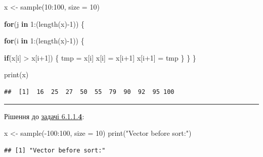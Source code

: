 \documentclass[
]{book}
\newenvironment{Shaded}{\begin{snugshade}}{\end{snugshade}}
\newcommand{\AttributeTok}[1]{\textcolor[rgb]{0.77,0.63,0.00}{#1}}
\newcommand{\ControlFlowTok}[1]{\textcolor[rgb]{0.13,0.29,0.53}{\textbf{#1}}}
\newcommand{\DecValTok}[1]{\textcolor[rgb]{0.00,0.00,0.81}{#1}}
\newcommand{\FunctionTok}[1]{\textcolor[rgb]{0.00,0.00,0.00}{#1}}
\newcommand{\NormalTok}[1]{#1}
\newcommand{\OtherTok}[1]{\textcolor[rgb]{0.56,0.35,0.01}{#1}}
\newcommand{\SpecialCharTok}[1]{\textcolor[rgb]{0.00,0.00,0.00}{#1}}
\newcommand{\StringTok}[1]{\textcolor[rgb]{0.31,0.60,0.02}{#1}}
\begin{document}
\begin{Shaded}
\begin{Highlighting}[]
\NormalTok{x }\OtherTok{\textless{}{-}} \FunctionTok{sample}\NormalTok{(}\DecValTok{10}\SpecialCharTok{:}\DecValTok{100}\NormalTok{, }\AttributeTok{size =} \DecValTok{10}\NormalTok{)}
  
\ControlFlowTok{for}\NormalTok{(j }\ControlFlowTok{in} \DecValTok{1}\SpecialCharTok{:}\NormalTok{(}\FunctionTok{length}\NormalTok{(x)}\SpecialCharTok{{-}}\DecValTok{1}\NormalTok{)) \{}
  
  \ControlFlowTok{for}\NormalTok{(i }\ControlFlowTok{in} \DecValTok{1}\SpecialCharTok{:}\NormalTok{(}\FunctionTok{length}\NormalTok{(x)}\SpecialCharTok{{-}}\DecValTok{1}\NormalTok{)) \{}
    
    \ControlFlowTok{if}\NormalTok{(x[i] }\SpecialCharTok{\textgreater{}}\NormalTok{ x[i}\SpecialCharTok{+}\DecValTok{1}\NormalTok{]) \{}
\NormalTok{      tmp }\OtherTok{=}\NormalTok{ x[i]}
\NormalTok{      x[i] }\OtherTok{=}\NormalTok{ x[i}\SpecialCharTok{+}\DecValTok{1}\NormalTok{]}
\NormalTok{      x[i}\SpecialCharTok{+}\DecValTok{1}\NormalTok{] }\OtherTok{=}\NormalTok{ tmp}
\NormalTok{    \}}
\NormalTok{  \}}
\NormalTok{\}}

\FunctionTok{print}\NormalTok{(x)}
\end{Highlighting}
\end{Shaded}

\begin{verbatim}
##  [1]  16  25  27  50  55  79  90  92  95 100
\end{verbatim}

\begin{center}\rule{0.5\linewidth}{0.5pt}\end{center}

Рішення до \protect\hyperlink{task6114}{задачі 6.1.1.\textbf{4}}:

\begin{Shaded}
\begin{Highlighting}[]
\NormalTok{x }\OtherTok{\textless{}{-}} \FunctionTok{sample}\NormalTok{(}\SpecialCharTok{{-}}\DecValTok{100}\SpecialCharTok{:}\DecValTok{100}\NormalTok{, }\AttributeTok{size =} \DecValTok{10}\NormalTok{)}
\FunctionTok{print}\NormalTok{(}\StringTok{"Vector before sort:"}\NormalTok{)}
\end{Highlighting}
\end{Shaded}

\begin{verbatim}
## [1] "Vector before sort:"
\end{verbatim}
\end{document}
